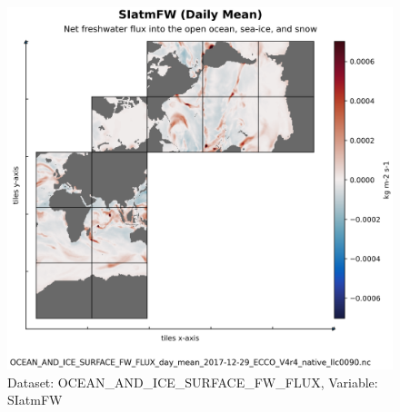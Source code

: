 \begin{figure}[H]
\centering
\includegraphics[scale=0.55]{../images/plots/native_plots/Ocean_and_Sea-Ice_Surface_Freshwater_Fluxes/SIatmFW.png}
\caption{Dataset: OCEAN\_AND\_ICE\_SURFACE\_FW\_FLUX, Variable: SIatmFW}
\label{tab:table-OCEAN_AND_ICE_SURFACE_FW_FLUX_SIatmFW-Plot}
\end{figure}
\pagebreak
